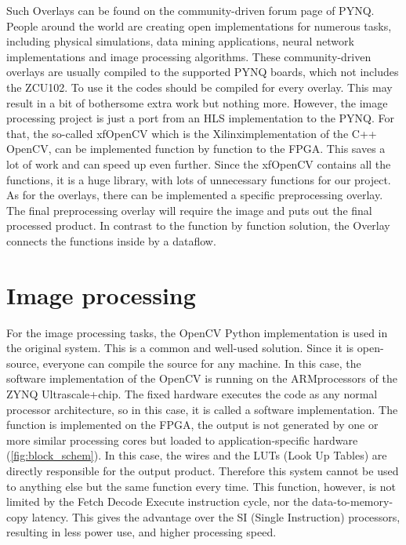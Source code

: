 Such Overlays can be found on the community-driven forum page of PYNQ.
People around the world are creating open implementations for numerous tasks, including physical simulations, data mining applications, neural network implementations and image processing algorithms.
These community-driven overlays are usually compiled to the supported PYNQ boards, which not includes the ZCU102.
To use it the codes should be compiled for every overlay.
This may result in a bit of bothersome extra work but nothing more.
However, the image processing project is just a port from an HLS implementation to the PYNQ.
For that, the so-called xfOpenCV which is the Xilinx\texttrademark implementation of the C++ OpenCV, can be implemented function by function to the FPGA.
This saves a lot of work and can speed up even further.
Since the xfOpenCV contains all the functions, it is a huge library, with lots of unnecessary functions for our project.
As for the overlays, there can be implemented a specific preprocessing overlay.
The final preprocessing overlay will require the image and puts out the final processed product.
In contrast to the function by function solution, the Overlay connects the functions inside by a dataflow.

\section{Image processing} %
For the image processing tasks, the OpenCV Python implementation is used in the original system.
This is a common and well-used solution.
Since it is open-source, everyone can compile the source for any machine.
In this case, the software implementation of the OpenCV is running on the ARM\texttrademark processors of the ZYNQ Ultrascale+\texttrademark chip.
The fixed hardware executes the code as any normal processor architecture, so in this case, it is called a software implementation.
The function is implemented on the FPGA, the output is not generated by one or more similar processing cores but loaded to application-specific hardware (\cref{fig:block_schem}).
In this case, the wires and the LUTs (Look Up Tables) are directly responsible for the output product.
Therefore this system cannot be used to anything else but the same function every time.
This function, however, is not limited by the Fetch Decode Execute instruction cycle, nor the data-to-memory-copy latency.
This gives the advantage over the SI (Single Instruction) processors, resulting in less power use, and higher processing speed.

